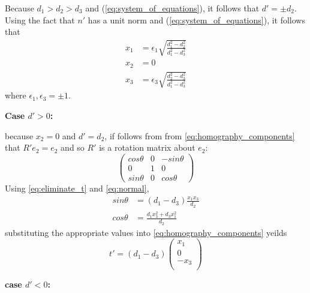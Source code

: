 \documentclass{article}
\begin{document}
%
Because $d_1 > d_2 > d_3$ and (\eqref {eq:system_of_equations}), it follows that $d' = \pm d_2$.
%
Using the fact that $n'$ has a unit norm and (\eqref {eq:system_of_equations}), it follows that
%
\begin {equation}
\label {eq:normal}
\begin {aligned}
x_1 &= \epsilon_1 \sqrt {\frac {d_1^2 - d_2^2}{d_1^2 - d_3^2}} \\
x_2 &= 0 \\
x_3 &= \epsilon_3 \sqrt {\frac {d_2^2 - d_3^2}{d_1^2 - d_3^2}}
\end {aligned}
\end {equation}
%
where $\epsilon_1, \epsilon_3 = \pm 1$.

\noindent
\textbf {Case $d' > 0$:}

\noindent
because $x_2 = 0$ and $d' = d_2$, if follows from from \eqref {eq:homography_components} that $R' e_2 = e_2$ and so $R'$ is a rotation matrix about $e_2$:
%
\begin {equation}
\begin {pmatrix}
cos \theta & 0 & -sin \theta \\
0          & 1 &    0        \\
sin \theta & 0 &  cos \theta
\end {pmatrix}
\end {equation}
%
Using \eqref {eq:eliminate_t} and \eqref {eq:normal},
%
\begin {equation}
\begin {aligned}
sin \theta &= (d_1 - d_3) \frac {x_1 x_3} {d_2} \\
cos \theta &= \frac {d_1 x_3^2 + d_3 x_1^2} {d_2}
\end {aligned}
\end {equation}
%
substituting the appropriate values into \eqref {eq:homography_components} yeilds
%
\begin {equation}
t' = (d_1 - d_3)
\begin {pmatrix}
x_1 \\
0 \\
-x_3 \\
\end {pmatrix}
\end {equation}

\noindent
\textbf {case $d' < 0$:}
\end{document}
